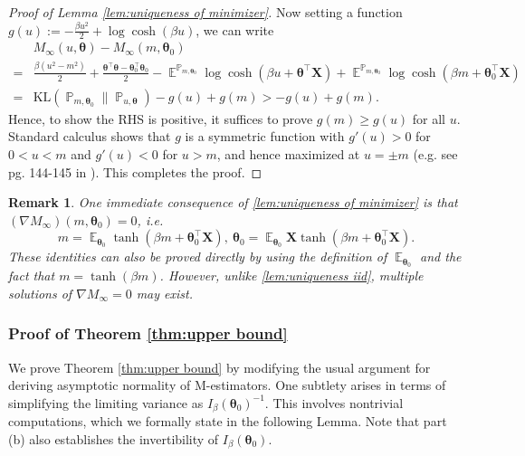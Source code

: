 \documentclass[preprint,reqno]{imsart}
\newtheorem{remark}{Remark}[section]
\newcommand{\ttheta}{\boldsymbol{\theta}}
\DeclareMathOperator{\EE}{\mathbb{E}}
\DeclareMathOperator{\PP}{\mathbb{P}}
\newcommand{\X}{\mathbf{X}}
\begin{document}
\begin{appendix}
\begin{proof}[Proof of Lemma \ref{lem:uniqueness of minimizer}]
Now setting a function $g(u) := - \frac{\beta u^2}{2} + \log \cosh(\beta u)$, we can write
\begin{align*}
    & M_{\infty}(u, \ttheta) - M_{\infty}(m, \ttheta_0) \\
    =& \frac{\beta (u^2 - m^2)}{2} + \frac{\ttheta^\top \ttheta - \ttheta_0^\top \ttheta_0}{2} - \EE^{\PP_{m, \ttheta_0}} \log \cosh(\beta u + \ttheta^\top \X) + \EE^{\PP_{m, \ttheta_0}} \log \cosh(\beta m + \ttheta_0^\top \X) \\
    =& \text{KL}(\PP_{m, \ttheta_0} \| \PP_{u, \ttheta}) - g(u) + g(m) > -g(u)+g(m).
\end{align*}
Hence, to show the RHS is positive, it suffices to prove $g(m) \ge g(u)$ for all $u$. Standard calculus shows that $g$ is a symmetric function with $g'(u) > 0$ for $0 < u<m$ and $g'(u) < 0$ for $u >m$, and hence maximized at $u = \pm m$ (e.g. see pg. 144-145 in \cite{dembo2010gibbs}). This completes the proof. %

%

%
%
%
%

%
%
%
%
%
%
%
%
%

%
%
%
%
%
%

%
%
%
%
%
%
%
%

%
%
%
\end{proof}

\begin{remark}
    One immediate consequence of \cref{lem:uniqueness of minimizer} is that $(\nabla M_{\infty}) (m, \ttheta_0) = 0$, i.e.
    \begin{equation}\label{eq:m,theta identies}
        m = \EE_{\ttheta_0} \tanh(\beta m + \ttheta_0^\top \X), ~ \ttheta_0 = \EE_{\ttheta_0} \X \tanh(\beta m + \ttheta_0^\top \X).
    \end{equation}
    These identities can also be proved directly by using the definition of $\EE_{\ttheta_0}$ and the fact that $m = \tanh(\beta m)$.
    However, unlike \cref{lem:uniqueness iid}, multiple solutions of $\nabla M_{\infty} = 0$ may exist.
\end{remark}

\subsubsection{Proof of Theorem \ref{thm:upper bound}}\label{subsec:main thm proof low tmp}
{We prove Theorem \ref{thm:upper bound} by modifying the usual argument for deriving asymptotic normality of M-estimators. One subtlety arises in terms of simplifying the limiting variance as $I_\beta(\ttheta_0)^{-1}$.} This involves nontrivial computations, which we formally state in the following Lemma. Note that part (b) also establishes the invertibility of $I_\beta(\ttheta_0)$.


\end{appendix}
\end{document}
